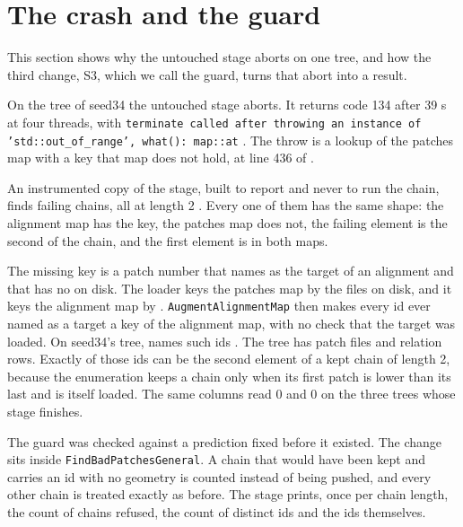 \section{The crash and the guard}

This section shows why the untouched stage aborts on one tree, and how the third change, S3, which we call the guard, turns that abort into a result.

On the tree of seed34 the untouched stage aborts. It returns code 134 after 39 s at four threads, with \texttt{terminate called after throwing an instance of 'std:\allowbreak{}:\allowbreak{}out\_\allowbreak{}\allowbreak{}of\_\allowbreak{}\allowbreak{}range',\allowbreak{} what(\allowbreak{}):\allowbreak{} map:\allowbreak{}:\allowbreak{}at} {}. The throw is a lookup of the patches map with a key that map does not hold, at line 436 of \protect{} {}{}.

An instrumented copy of the stage, built to report and never to run the chain, finds \RefusedChainsTwo{} failing chains, all at length 2 {}. Every one of them has the same shape: the alignment map has the key, the patches map does not, the failing element is the second of the chain, and the first element is in both maps.

The missing key is a patch number that \protect{} names as the target of an alignment and that has no \protect{} on disk. The loader keys the patches map by the files on disk, and it keys the alignment map by \protect{}. \texttt{AugmentAlignmentMap} then makes every id ever named as a target a key of the alignment map, with no check that the target was loaded. On seed34's tree, \protect{} names \MixedOrphanIds{} such ids {}. The tree has \SeedPatchesThirtyFour{} patch files and \SeedRelLinesThirtyFour{} relation rows. Exactly \RefusedPatchesTwo{} of those ids can be the second element of a kept chain of length 2, because the enumeration keeps a chain only when its first patch is lower than its last and is itself loaded. The same columns read 0 and 0 on the three trees whose stage finishes.

The guard was checked against a prediction fixed before it existed. The change sits inside \texttt{FindBadPatchesGeneral}. A chain that would have been kept and carries an id with no geometry is counted instead of being pushed, and every other chain is treated exactly as before. The stage prints, once per chain length, the count of chains refused, the count of distinct ids and the ids themselves.

